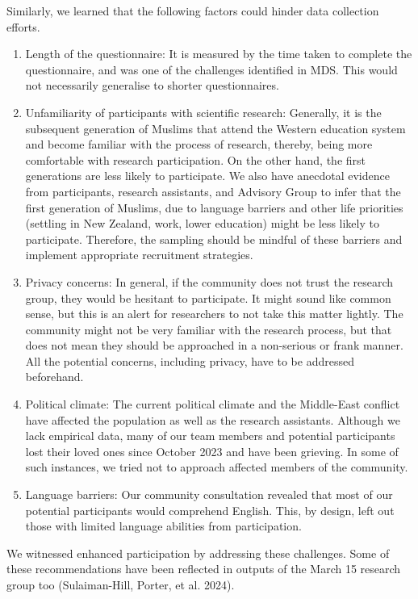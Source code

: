 \documentclass[
]{interact}
\providecommand{\tightlist}{%
  \setlength{\itemsep}{0pt}\setlength{\parskip}{0pt}}\usepackage{longtable,booktabs,array}
\begin{document}
Similarly, we learned that the following factors could hinder data
collection efforts.

\begin{enumerate}
\def\labelenumi{\arabic{enumi}.}
\tightlist
\item
  Length of the questionnaire: It is measured by the time taken to
  complete the questionnaire, and was one of the challenges identified
  in MDS. This would not necessarily generalise to shorter
  questionnaires.
\item
  Unfamiliarity of participants with scientific research: Generally, it
  is the subsequent generation of Muslims that attend the Western
  education system and become familiar with the process of research,
  thereby, being more comfortable with research participation. On the
  other hand, the first generations are less likely to participate. We
  also have anecdotal evidence from participants, research assistants,
  and Advisory Group to infer that the first generation of Muslims, due
  to language barriers and other life priorities (settling in New
  Zealand, work, lower education) might be less likely to participate.
  Therefore, the sampling should be mindful of these barriers and
  implement appropriate recruitment strategies.
\item
  Privacy concerns: In general, if the community does not trust the
  research group, they would be hesitant to participate. It might sound
  like common sense, but this is an alert for researchers to not take
  this matter lightly. The community might not be very familiar with the
  research process, but that does not mean they should be approached in
  a non-serious or frank manner. All the potential concerns, including
  privacy, have to be addressed beforehand.
\item
  Political climate: The current political climate and the Middle-East
  conflict have affected the population as well as the research
  assistants. Although we lack empirical data, many of our team members
  and potential participants lost their loved ones since October 2023
  and have been grieving. In some of such instances, we tried not to
  approach affected members of the community.
\item
  Language barriers: Our community consultation revealed that most of
  our potential participants would comprehend English. This, by design,
  left out those with limited language abilities from participation.
\end{enumerate}

We witnessed enhanced participation by addressing these challenges. Some
of these recommendations have been reflected in outputs of the March 15
research group too (Sulaiman-Hill, Porter, et al. 2024).
\end{document}
